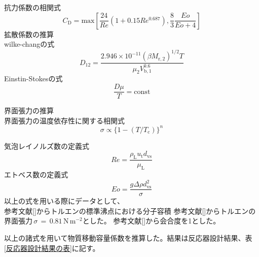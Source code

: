 \documentclass[a4j]{jsreport}
\begin{document}
抗力係数の相関式
\begin{equation}
    C_{\mathrm{ D}} = \mathrm{ max}[\frac{24}{Re}(1+0.15Re^{0.687}), \frac{8}{3}\frac{Eo}{Eo+4}]
\end{equation}
拡散係数の推算\\
wilke-changの式
\begin{equation}
    D_{12} = \frac{2.946\times 10^{-11}(\beta M_{\mathrm{ r,2}})^{1/2} T} {\mu_2 V_{\mathrm{ b,1}}^{0.6}}
\end{equation}
Einstin-Stokesの式
\begin{equation}
    \frac{D \mu}{T} = \mathrm{ const}
\end{equation}

界面張力の推算\\
界面張力の温度依存性に関する相関式
\begin{equation}
    \sigma \propto \{1-(T/T_{\mathrm{ c}}) \}^n    
\end{equation}

気泡レイノルズ数の定義式
\begin{equation}
    Re = \frac{\rho_{\mathrm{ L}}u_{\mathrm{ t}}d_{\mathrm{ vs}}}{\mu_{\mathrm{ L}}}
\end{equation}
エトベス数の定義式
\begin{equation}
    Eo = \frac{g \Delta \rho d_{\mathrm{ vs}}^2}{\sigma}
\end{equation}
以上の式を用いる際にデータとして、\\
参考文献[]からトルエンの標準沸点における分子容積
参考文献[]からトルエンの界面張力\,$\sigma\,=\,0.81\,\mathrm{ N\,m^{-2}}$とした。
参考文献[]から会合度を1とした。
\par
以上の諸式を用いて物質移動容量係数を推算した。結果は反応器設計結果、表\ref{反応器設計結果の表}に記す。
\end{document}
